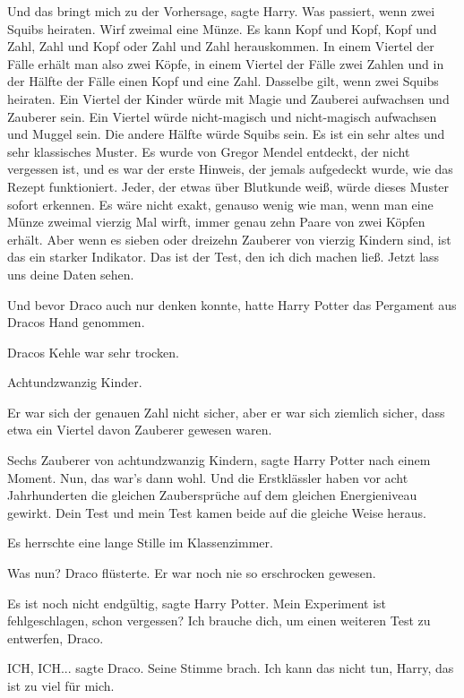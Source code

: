 \glqq Und das bringt mich zu der Vorhersage\grqq{}, sagte Harry. \glqq Was
passiert, wenn zwei Squibs heiraten. Wirf zweimal eine Münze. Es kann Kopf und
Kopf, Kopf und Zahl, Zahl und Kopf oder Zahl und Zahl herauskommen. In einem
Viertel der Fälle erhält man also zwei Köpfe, in einem Viertel der Fälle zwei
Zahlen und in der Hälfte der Fälle einen Kopf und eine Zahl. Dasselbe gilt, wenn
zwei Squibs heiraten. Ein Viertel der Kinder würde mit Magie und Zauberei
aufwachsen und Zauberer sein. Ein Viertel würde nicht-magisch und nicht-magisch
aufwachsen und Muggel sein. Die andere Hälfte würde Squibs sein. Es ist ein sehr
altes und sehr klassisches Muster. Es wurde von Gregor Mendel entdeckt, der
nicht vergessen ist, und es war der erste Hinweis, der jemals aufgedeckt wurde,
wie das Rezept funktioniert. Jeder, der etwas über Blutkunde weiß, würde dieses
Muster sofort erkennen. Es wäre nicht exakt, genauso wenig wie man, wenn man
eine Münze zweimal vierzig Mal wirft, immer genau zehn Paare von zwei Köpfen
erhält. Aber wenn es sieben oder dreizehn Zauberer von vierzig Kindern sind, ist
das ein starker Indikator. Das ist der Test, den ich dich machen ließ. Jetzt
lass uns deine Daten sehen.\grqq{}

Und bevor Draco auch nur denken konnte, hatte Harry Potter das Pergament aus
Dracos Hand genommen.

Dracos Kehle war sehr trocken.

Achtundzwanzig Kinder.

Er war sich der genauen Zahl nicht sicher, aber er war sich ziemlich sicher,
dass etwa ein Viertel davon Zauberer gewesen waren.

\glqq Sechs Zauberer von achtundzwanzig Kindern\grqq{}, sagte Harry Potter nach
einem Moment. \glqq Nun, das war's dann wohl. Und die Erstklässler haben vor
acht Jahrhunderten die gleichen Zaubersprüche auf dem gleichen Energieniveau
gewirkt. Dein Test und mein Test kamen beide auf die gleiche Weise
heraus.\grqq{}

Es herrschte eine lange Stille im Klassenzimmer.

\glqq Was nun?\grqq{} Draco flüsterte. Er war noch nie so erschrocken gewesen.

\glqq Es ist noch nicht endgültig\grqq{}, sagte Harry Potter. \glqq Mein
Experiment ist fehlgeschlagen, schon vergessen? Ich brauche dich, um einen
weiteren Test zu entwerfen, Draco.\grqq{}

\glqq ICH, ICH...\grqq{} sagte Draco. Seine Stimme brach. \glqq Ich kann das
nicht tun, Harry, das ist zu viel für mich.\grqq{}

